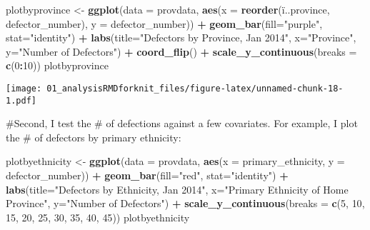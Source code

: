 \documentclass[]{article}
\newenvironment{Shaded}{\begin{snugshade}}{\end{snugshade}}
\newcommand{\DataTypeTok}[1]{\textcolor[rgb]{0.13,0.29,0.53}{#1}}
\newcommand{\DecValTok}[1]{\textcolor[rgb]{0.00,0.00,0.81}{#1}}
\newcommand{\KeywordTok}[1]{\textcolor[rgb]{0.13,0.29,0.53}{\textbf{#1}}}
\newcommand{\NormalTok}[1]{#1}
\newcommand{\OperatorTok}[1]{\textcolor[rgb]{0.81,0.36,0.00}{\textbf{#1}}}
\newcommand{\StringTok}[1]{\textcolor[rgb]{0.31,0.60,0.02}{#1}}
\begin{document}
\begin{Shaded}
\begin{Highlighting}[]
\NormalTok{plotbyprovince <{-}}\StringTok{ }\KeywordTok{ggplot}\NormalTok{(}\DataTypeTok{data =}\NormalTok{ provdata, }\KeywordTok{aes}\NormalTok{(}\DataTypeTok{x =} \KeywordTok{reorder}\NormalTok{(ï..province, defector\_number), }\DataTypeTok{y =}\NormalTok{ defector\_number)) }\OperatorTok{+}
\StringTok{  }\KeywordTok{geom\_bar}\NormalTok{(}\DataTypeTok{fill=}\StringTok{"purple"}\NormalTok{, }\DataTypeTok{stat=}\StringTok{"identity"}\NormalTok{) }\OperatorTok{+}\StringTok{ }\KeywordTok{labs}\NormalTok{(}\DataTypeTok{title=}\StringTok{"Defectors by Province, Jan 2014"}\NormalTok{, }\DataTypeTok{x=}\StringTok{"Province"}\NormalTok{, }\DataTypeTok{y=}\StringTok{"Number of Defectors"}\NormalTok{) }\OperatorTok{+}\StringTok{ }\KeywordTok{coord\_flip}\NormalTok{() }\OperatorTok{+}\StringTok{ }\KeywordTok{scale\_y\_continuous}\NormalTok{(}\DataTypeTok{breaks =} \KeywordTok{c}\NormalTok{(}\DecValTok{0}\OperatorTok{:}\DecValTok{10}\NormalTok{))}
\NormalTok{plotbyprovince}
\end{Highlighting}
\end{Shaded}

\texttt{[image: 01\_analysisRMDforknit\_files/figure-latex/unnamed-chunk-18-1.pdf]}

\#Second, I test the \# of defections against a few covariates. For
example, I plot the \# of defectors by primary ethnicity:

\begin{Shaded}
\begin{Highlighting}[]
\NormalTok{plotbyethnicity <{-}}\StringTok{ }\KeywordTok{ggplot}\NormalTok{(}\DataTypeTok{data =}\NormalTok{ provdata, }\KeywordTok{aes}\NormalTok{(}\DataTypeTok{x =}\NormalTok{ primary\_ethnicity, }\DataTypeTok{y =}\NormalTok{ defector\_number)) }\OperatorTok{+}
\StringTok{  }\KeywordTok{geom\_bar}\NormalTok{(}\DataTypeTok{fill=}\StringTok{"red"}\NormalTok{, }\DataTypeTok{stat=}\StringTok{"identity"}\NormalTok{) }\OperatorTok{+}\StringTok{ }\KeywordTok{labs}\NormalTok{(}\DataTypeTok{title=}\StringTok{"Defectors by Ethnicity, Jan 2014"}\NormalTok{, }\DataTypeTok{x=}\StringTok{"Primary Ethnicity of Home Province"}\NormalTok{, }\DataTypeTok{y=}\StringTok{"Number of Defectors"}\NormalTok{) }\OperatorTok{+}\StringTok{ }\KeywordTok{scale\_y\_continuous}\NormalTok{(}\DataTypeTok{breaks =} \KeywordTok{c}\NormalTok{(}\DecValTok{5}\NormalTok{, }\DecValTok{10}\NormalTok{, }\DecValTok{15}\NormalTok{, }\DecValTok{20}\NormalTok{, }\DecValTok{25}\NormalTok{, }\DecValTok{30}\NormalTok{, }\DecValTok{35}\NormalTok{, }\DecValTok{40}\NormalTok{, }\DecValTok{45}\NormalTok{))}
\NormalTok{plotbyethnicity}
\end{Highlighting}
\end{Shaded}
\end{document}
